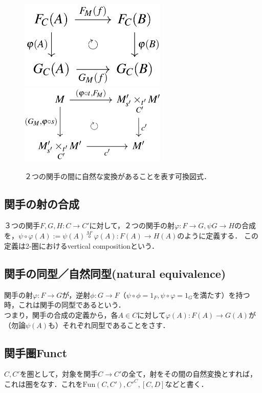 \documentclass[uplatex, 12pt, a4paper, dvipdfmx]{jsarticle}
\begin{document}
\begin{figure}[ht]\begin{center}
    \caption{２つの関手の間に自然な変換があることを表す可換図式．\label{def-cd:15}}
    \includegraphics[width=7cm]{cd-15.png}
    \includegraphics[width=7cm]{cd-14.png}
\end{center}\end{figure}

\subsection{関手の射の合成}
３つの関手$F,G,H:C\longrightarrow C'$に対して，２つの関手の射$\varphi :F\longrightarrow G, \psi G\longrightarrow H$の合成を，$\psi\circ\varphi (A):=\psi (A)\overset{M'}{\circ}\varphi (A):F(A)\longrightarrow H(A)$のように定義する．
この定義は2-圏におけるvertical compositionという．

\subsection{関手の同型／自然同型(natural equivalence)}
関手の射$\varphi :F\longrightarrow G$が，逆射$\phi :G\longrightarrow F$（$\psi\circ\phi =1_F, \psi\circ\varphi =1_G$を満たす）を持つ時，これは関手の同型であるという．\\
つまり，関手の合成の定義から，各$A\in C$に対して$\varphi (A):F(A)\longrightarrow G(A)$が（勿論$\psi (A)$も）それぞれ同型であることをさす．

\subsection{関手圏\textrm{Funct}}
$C,C'$を圏として，対象を関手$C\longrightarrow C'$の全て，射をその間の自然変換とすれば，これは圏をなす．これを$\mathrm{Fun}(C,C'), {C'}^{C}, [C,D]$などと書く．
\end{document}
